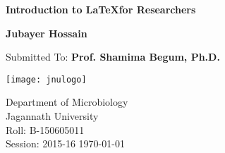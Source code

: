 
\begin{titlepage}	
	\centering 	
	{\LARGE \bfseries Introduction to \LaTeX for Researchers}
	\vspace{3\baselineskip}
	
	{\Huge \bfseries Jubayer Hossain}
	\vspace{3\baselineskip}
	
	{\Large Submitted To: \bfseries Prof. Shamima Begum, Ph.D.}
	\vspace{3\baselineskip}
	
	\texttt{[image: jnulogo]}
	\vspace{3\baselineskip}
	
	{\Large Department of Microbiology} \\
	{\Large Jagannath University} \\ 
	{\Large Roll: B-150605011} \\ 
	{\Large Session: 2015-16}
	{\Large \today}    
	
\end{titlepage}		